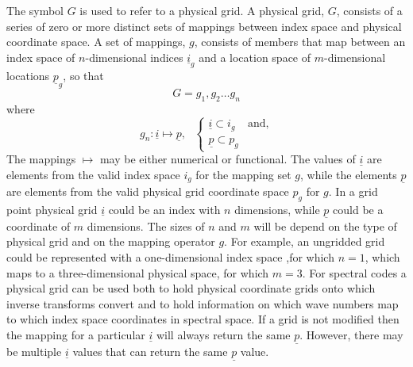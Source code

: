 The symbol $G$ is used to refer to a physical grid. A physical grid, $G$, 
consists of a series of zero or more distinct sets of mappings between index space
and physical coordinate space. A set of mappings, $g$, consists of members
that map between an index space of $n$-dimensional indices
$\underline{i}_{g}$ and a location space of 
$m$-dimensional locations $\underline{p}_{g}$, so that
\begin{equation}
G = g_{1}, g_{2} \ldots g_{n}
\end{equation}
\noindent where
\begin{equation}
g_{n}: \underline{i} \mapsto \underline{p},~~~
\begin{cases}
  \underline{i} \subset i_{g} & \text{and}, \\
  \underline{p} \subset p_{g} & \text{}
\end{cases}
\end{equation}
The mappings $\mapsto$ may be either numerical or functional.
The values of $\underline{i}$ are elements from the valid index space
$i_{g}$ for the mapping set $g$, while the elements $\underline{p}$ are elements
from the valid physical grid coordinate space $p_{g}$ for $g$.
In a grid point physical grid $\underline{i}$ could be
an index with $n$ dimensions, while $\underline{p}$ could
be a coordinate of $m$ dimensions. The sizes of 
$n$ and $m$ will be depend on the type of physical 
grid and on the mapping operator $g$. For example, an ungridded 
grid could be represented with a one-dimensional index space
,for which $n=1$,
which maps to a three-dimensional physical space, for which $m=3$.
For spectral codes a physical grid can be used both
to hold physical coordinate grids onto which inverse transforms
convert and to hold information on which wave numbers map
to which index space coordinates in spectral space.
If a grid is not modified then the mapping for a particular
$\underline{i}$ will always return the same $\underline{p}$.
However, there may be multiple $\underline{i}$ values that
can return the same $\underline{p}$ value.

